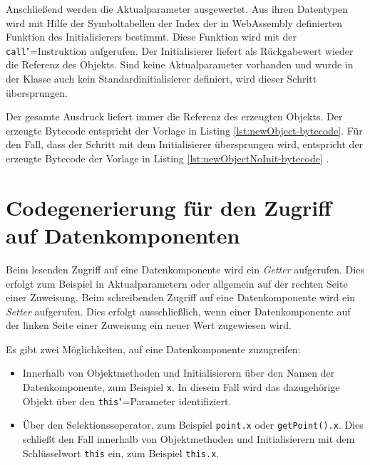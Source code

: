 Anschließend werden die Aktualparameter ausgewertet. Aus ihren Datentypen wird mit Hilfe der Symboltabellen der Index der in WebAssembly definierten Funktion des Initialisierers bestimmt. Diese Funktion wird mit der \lstinline{call}"=Instruktion aufgerufen. Der Initialisierer liefert als Rückgabewert wieder die Referenz des Objekts. Sind keine Aktualparameter vorhanden und wurde in der Klasse auch kein Standardinitialisierer definiert, wird dieser Schritt übersprungen.

Der gesamte Ausdruck liefert immer die Referenz des erzeugten Objekts. Der erzeugte Bytecode entspricht der Vorlage in Listing \ref{lst:newObject-bytecode}. Für den Fall, dass der Schritt mit dem Initialisierer übersprungen wird, entspricht der erzeugte Bytecode der Vorlage in Listing \ref{lst:newObjectNoInit-bytecode} .





\section{Codegenerierung für den Zugriff auf Datenkomponenten}
\label{sec:Codegenerierung-für-den-Zugriff-auf-Datenkomponenten}

Beim lesenden Zugriff auf eine Datenkomponente wird ein \emph{Getter} aufgerufen. Dies erfolgt zum Beispiel in Aktualparametern oder allgemein auf der rechten Seite einer Zuweisung. Beim schreibenden Zugriff auf eine Datenkomponente wird ein \emph{Setter} aufgerufen. Dies erfolgt ausschließlich, wenn einer Datenkomponente auf der linken Seite einer Zuweisung ein neuer Wert zugewiesen wird.

Es gibt zwei Möglichkeiten, auf eine Datenkomponente zuzugreifen:
\begin{itemize}
    \item Innerhalb von Objektmethoden und Initialisierern über den Namen der Datenkomponente, zum Beispiel \lstinline{x}. In diesem Fall wird das dazugehörige Objekt über den \lstinline{this}"=Parameter identifiziert.
    \item Über den Selektionssoperator, zum Beispiel \lstinline{point.x} oder \lstinline{getPoint().x}. Dies schließt den Fall innerhalb von Objektmethoden und Initialisierern mit dem Schlüsselwort \lstinline{this} ein, zum Beispiel \lstinline{this.x}.
\end{itemize}

